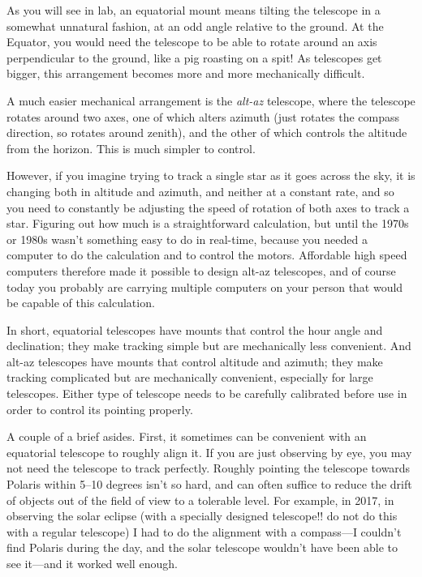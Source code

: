 \documentclass[12pt, preprint]{aastex}
\begin{document}
As you will see in lab, an equatorial mount means tilting the
telescope in a somewhat unnatural fashion, at an odd angle relative to
the ground. At the Equator, you would need the telescope to be able to
rotate around an axis perpendicular to the ground, like a pig roasting
on a spit! As telescopes get bigger, this arrangement becomes more and
more mechanically difficult.

A much easier mechanical arrangement is the {\it alt-az} telescope,
where the telescope rotates around two axes, one of which alters
azimuth (just rotates the compass direction, so rotates around
zenith), and the other of which controls the altitude from the
horizon.  This is much simpler to control.

However, if you imagine trying to track a single star as it goes
across the sky, it is changing both in altitude and azimuth, and
neither at a constant rate, and so you need to constantly be adjusting
the speed of rotation of both axes to track a star. Figuring out how
much is a straightforward calculation, but until the 1970s or 1980s
wasn't something easy to do in real-time, because you needed a
computer to do the calculation and to control the motors. Affordable
high speed computers therefore made it possible to design alt-az
telescopes, and of course today you probably are carrying multiple
computers on your person that would be capable of this calculation.

In short, equatorial telescopes have mounts that control the hour
angle and declination; they make tracking simple but are mechanically
less convenient. And alt-az telescopes have mounts that control
altitude and azimuth; they make tracking complicated but are
mechanically convenient, especially for large telescopes. Either type
of telescope needs to be carefully calibrated before use in order to
control its pointing properly.

A couple of a brief asides. First, it sometimes can be convenient with
an equatorial telescope to roughly align it. If you are just observing
by eye, you may not need the telescope to track perfectly. Roughly
pointing the telescope towards Polaris within 5--10 degrees isn't so
hard, and can often suffice to reduce the drift of objects out of the
field of view to a tolerable level. For example, in 2017, in observing
the solar eclipse (with a specially designed telescope!! do not do
this with a regular telescope) I had to do the alignment with a
compass---I couldn't find Polaris during the day, and the solar
telescope wouldn't have been able to see it---and it worked well
enough.
\end{document}
